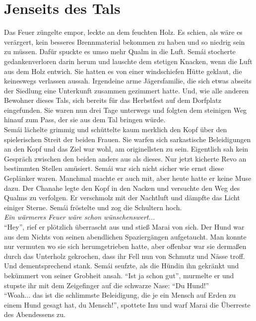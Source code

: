 \chapter{Jenseits des Tals}

Das Feuer züngelte empor, leckte an dem feuchten Holz. Es schien, als wäre es verärgert, kein 
besseres Brennmaterial bekommen zu haben und so niedrig sein zu müssen. Dafür spuckte es umso mehr 
Qualm in die Luft. Semái stocherte gedankenverloren darin herum und lauschte dem stetigen Knacken, 
wenn die Luft aus dem Holz entwich. Sie hatten es von einer windschiefen Hütte geklaut, die 
keineswegs verlassen aussah. Irgendeine arme Jägersfamilie, die sich etwas abseits der Siedlung 
eine Unterkunft zusammen gezimmert hatte. Und, wie alle anderen Bewohner dieses Tals, sich bereits 
für das Herbstfest auf dem Dorfplatz eingefunden.
Sie waren nun drei Tage unterwegs und folgten dem steinigen Weg hinauf zum Pass, der sie aus dem 
Tal bringen würde.\\
Semái lächelte grimmig und schüttelte kaum merklich den Kopf über den spielerischen Streit der 
beiden Frauen. Sie warfen sich sarkastische Beleidigungen an den Kopf und das Ziel war wohl, am 
originellsten zu sein. Eigentlich sah kein Gespräch zwischen den beiden anders aus als dieses. Nur 
jetzt kicherte Revo an bestimmten Stellen amüsiert. Semái war sich nicht sicher wie ernst diese 
Geplänker waren. Manchmal machte er auch mit, aber heute hatte er keine Muse dazu. Der Chanahe legte 
den Kopf in den Nacken und versuchte den Weg des Qualms zu verfolgen. Er verschmolz mit der 
Nachtluft und dämpfte das Licht einiger Sterne. Semái fröstelte und zog die Schultern hoch.\\
\textit{Ein wärmeres Feuer wäre schon wünschenswert...}\\
``Hey'', rief er plötzlich überrascht aus und stieß Marai von sich. Der Hund war aus dem Nichts von 
seinen abendlichen Spaziergängen aufgetaucht. Man konnte nur vermuten wo sie sich herumgetrieben 
hatte, aber offenbar war sie dermaßen durch das Unterholz gekrochen, dass ihr Fell nun von 
Schmutz und Nässe troff. Und dementsprechend stank. Semái seufzte, als die Hündin ihn gekränkt und 
bekümmert von seiner Grobheit ansah. ``Ist ja schon gut'', murmelte er und stupste ihr mit dem 
Zeigefinger auf die schwarze Nase: ``Du Hund!''\\
``Woah... das ist die schlimmste Beleidigung, die je ein Mensch auf Erden zu einem Hund gesagt hat, 
du Mensch!'', spottete Inu und warf Marai die Überreste des Abendessens zu.\\
